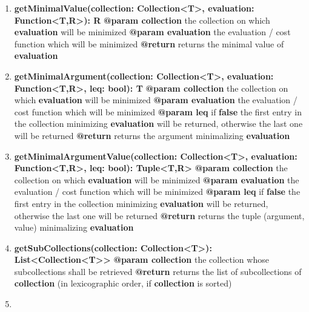 \documentclass{article}
\begin{document}
	\begin{enumerate}[+]
		\item{
			\textbf{getMinimalValue(collection: Collection<T>, evaluation: Function<T,R>): R} \newline
			\textbf{@param collection} the collection on which \textbf{evaluation} will be minimized \newline
			\textbf{@param evaluation} the evaluation / cost function which will be minimized \newline
			\textbf{@return} returns the minimal value of \textbf{evaluation}
		}
		\item{
			\textbf{getMinimalArgument(collection: Collection<T>, evaluation: Function<T,R>, leq: bool): T} \newline
			\textbf{@param collection} the collection on which \textbf{evaluation} will be minimized \newline
			\textbf{@param evaluation} the evaluation / cost function which will be minimized \newline
			\textbf{@param leq} if \textbf{false} the first entry in the collection minimizing \textbf{evaluation} will be returned, otherwise the last one will be returned \newline
			\textbf{@return} returns the argument minimalizing \textbf{evaluation}
		}
		\item{
			\textbf{getMinimalArgumentValue(collection: Collection<T>, evaluation: Function<T,R>, leq: bool): Tuple<T,R>} \newline
			\textbf{@param collection} the collection on which \textbf{evaluation} will be minimized \newline
			\textbf{@param evaluation} the evaluation / cost function which will be minimized \newline
			\textbf{@param leq} if \textbf{false} the first entry in the collection minimizing \textbf{evaluation} will be returned, otherwise the last one will be returned \newline
			\textbf{@return} returns the tuple (argument, value) minimalizing \textbf{evaluation}
		}
		\item{
			\textbf{getSubCollections(collection: Collection<T>): List<Collection<T>>} \newline
			\textbf{@param collection} the collection whose subcollections shall be retrieved \newline
			\textbf{@return} returns the list of subcollections of \textbf{collection} (in lexicographic order, if \textbf{collection} is sorted)
		}
		\item{
}
\end{enumerate}
\end{document}
